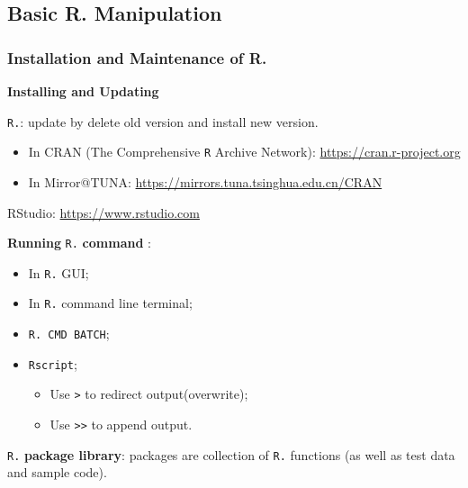 \subsection{Basic R. Manipulation}


\subsubsection{Installation and Maintenance of R.}
\begin{point}
    \textbf{Installing and Updating} 
\end{point}

\noindent  \lstinline|R.|: update by delete old version and install new version.
\begin{itemize}[topsep=2pt,itemsep=0pt]
    \item In CRAN (The Comprehensive \lstinline|R| Archive Network): \url{https://cran.r-project.org}
    \item In Mirror@TUNA: \url{https://mirrors.tuna.tsinghua.edu.cn/CRAN}
\end{itemize}

\noindent RStudio: \url{https://www.rstudio.com}


\begin{point}
    \textbf{Running}  \lstinline|R.| \textbf{command} :
\end{point}

\begin{itemize}[topsep=2pt,itemsep=0pt]
    \item In \lstinline|R.| GUI;
    \item In \lstinline|R.| command line terminal;
    \item \lstinline|R. CMD BATCH|;
    \item \lstinline|Rscript|;
        \begin{itemize}[topsep=2pt,itemsep=0pt]
        \item Use \lstinline|>| to redirect output(overwrite);
        \item Use \lstinline|>>| to append output.
        \end{itemize}
\end{itemize}



\begin{point}
    \lstinline|R.| \textbf{package library}: packages are collection of \lstinline|R.| functions (as well as test data and sample code).
\end{point}

